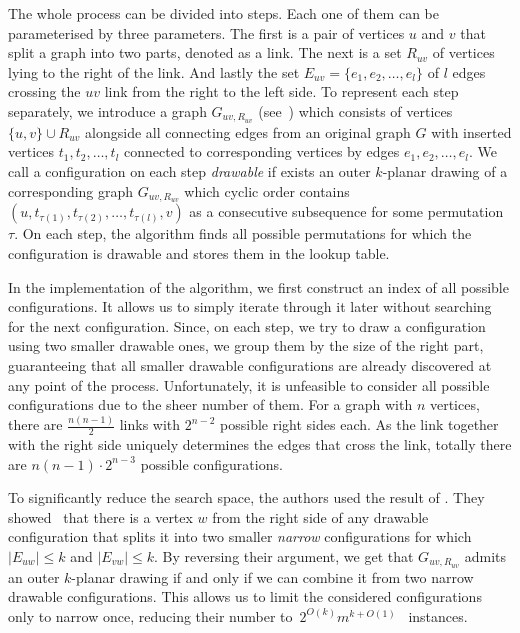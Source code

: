 The whole process can be divided into steps. Each one of them can be parameterised by three parameters. The first is a pair of vertices \(u\) and \(v\) that split a graph into two parts, denoted as a link. The next is a set \(R_{uv}\) of vertices lying to the right of the link. And lastly the set \(E_{uv} = \{e_1, e_2, \dots, e_l\}\) of \(l\) edges crossing the \(uv\) link from the right to the left side. To represent each step separately, we introduce a graph \(G_{uv, R_{uv}}\) (see~) which consists of vertices \(\{u, v\} \cup R_{uv}\) alongside all connecting edges from an original graph \(G\) with inserted vertices \(t_1, t_2, \dots, t_l\) connected to corresponding vertices by edges \(e_1, e_2, \dots, e_l\). We call a configuration on each step \emph{drawable} if exists an outer \(k\)-planar drawing of a corresponding graph \(G_{uv, R_{uv}}\) which cyclic order contains \((u, t_{\tau(1)}, t_{\tau(2)}, \dots, t_{\tau(l)}, v)\) as a consecutive subsequence for some permutation \(\tau\). On each step, the algorithm finds all possible permutations for which the configuration is drawable and stores them in the lookup table.

In the implementation of the algorithm, we first construct an index of all possible configurations. It allows us to simply iterate through it later without searching for the next configuration. Since, on each step, we try to draw a configuration using two smaller drawable ones, we group them by the size of the right part, guaranteeing that all smaller drawable configurations are already discovered at any point of the process. Unfortunately, it is unfeasible to consider all possible configurations due to the sheer number of them. For a graph with \(n\) vertices, there are \(\frac{n(n-1)}{2}\) links with \(2^{n-2}\) possible right sides each. As the link together with the right side uniquely determines the edges that cross the link, totally there are \(n(n-1)\cdot2^{n-3}\) possible configurations.

To significantly reduce the search space, the authors used the result of \citeauthor{triangulations}. They showed~\cite{triangulations} that there is a vertex \(w\) from the right side of any drawable configuration that splits it into two smaller \emph{narrow} configurations for which \(|E_{uw}| \leqslant k\) and \(|E_{vw}| \leqslant k\). By reversing their argument, we get that \(G_{uv, R_{uv}}\) admits an outer \(k\)-planar drawing if and only if we can combine it from two narrow drawable configurations. This allows us to limit the considered configurations only to narrow once, reducing their number to~\(2^{O(k)}m^{k+O(1)}\)~\cite[Lemma 15]{okp} instances.

